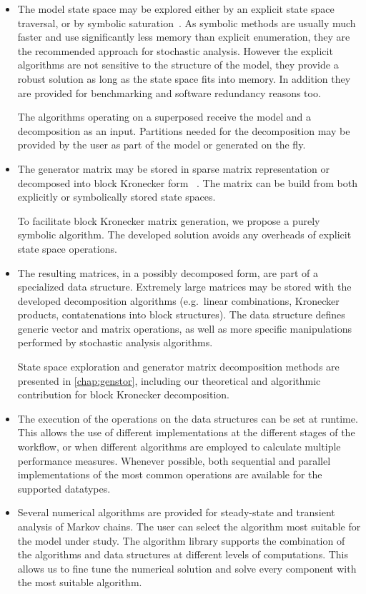 \begin{itemize}
\item The model state space may be explored either by an explicit 
  state space traversal, or by symbolic
  saturation~\citep{Ciardo:2006}. As symbolic methods are usually much
  faster and use significantly less memory than explicit enumeration,
  they are the recommended approach for stochastic analysis. However the explicit algorithms are not sensitive to the structure of the model, they provide a robust solution as long as the state space fits into memory. In addition they are provided for benchmarking and software redundancy reasons too.

  The algorithms operating on a superposed
   receive the model and a decomposition as an input. Partitions needed for the decomposition may be provided by the user
  as part of the model or generated on the fly.
\item The generator matrix may be stored in sparse matrix representation or decomposed into block
  Kronecker form%
  ~\citep{DBLP:journals/sigmetrics/BuchholzK98}. The matrix can be
  build from both explicitly or symbolically stored state spaces.

  To facilitate block Kronecker matrix generation, we propose a purely
  symbolic algorithm. The developed solution avoids any overheads of explicit state
  space operations.
\item The resulting matrices, in a possibly decomposed form, are part of a
  specialized data structure. Extremely large matrices may be stored
  with the developed decomposition algorithms (e.g.~linear combinations,
  Kronecker products, contatenations into block structures). The data
  structure defines generic vector and matrix operations, as well as
  more specific manipulations performed by stochastic analysis
  algorithms.

  State space exploration and generator matrix decomposition methods
  are presented in \cref{chap:genstor}, including our theoretical and algorithmic
  contribution for block Kronecker decomposition.
\item The execution of the operations on the data structures can be
  set at runtime. This allows the use of different
  implementations at the different stages of the workflow, or when
  different algorithms are employed to calculate multiple performance
  measures. Whenever possible, both sequential and parallel
  implementations of the most common operations are available for the
  supported datatypes.
\item Several numerical algorithms are provided for steady-state and
  transient analysis of Markov chains. The user can select the
  algorithm most suitable for the model under study. The algorithm library supports the combination of the algorithms and data structures at different levels of computations. This allows us to fine tune the numerical solution and solve every component with the most suitable algorithm.


\end{itemize}
